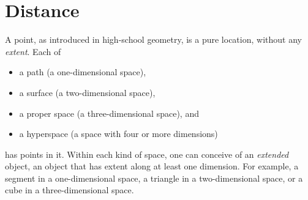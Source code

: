 

\chapter{Distance}
\label{ch:distance}

A point, as introduced in high-school geometry, is a pure location, without any
\emph{extent}.  Each of
\begin{itemize}[noitemsep]
   \item a path (a one-dimensional space),
   \item a surface (a two-dimensional space),
   \item a proper space (a three-dimensional space), and
   \item a hyperspace (a space with four or more dimensions)
\end{itemize}
has points in it.  Within each kind of space, one can conceive of an
\emph{extended} object, an object that has extent along at least one dimension.
For example, a segment in a one-dimensional space, a triangle in a
two-dimensional space, or a cube in a three-dimensional space.

